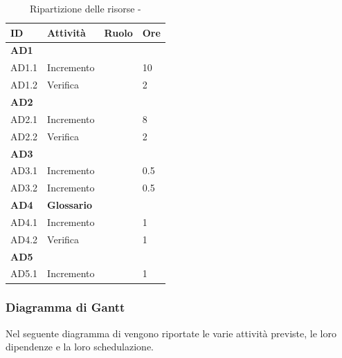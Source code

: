 \documentclass[12pt,a4paper]{article}
\begin{document}
\begin{table}[H]
	\begin{center}
		\begin{tabular}{p{} p{} p{} p{}}
			\toprule
			\textbf{ID}	& \textbf{Attività}	& \textbf{Ruolo} & \textbf{Ore}\\ \midrule
			\midrule
			\textbf{AD1} & \textbf{\AdR{}} & &  \\ \midrule
			AD1.1 & Incremento & \AN{} & 10 \\ \midrule
			AD1.2 & Verifica & \VR{} & 2 \\ \midrule
			\textbf{AD2} & \textbf{\NdP{}} &  &  \\ \midrule
			AD2.1 & Incremento & \AM{} & 8 \\ \midrule
			AD2.2 & Verifica & \VR{} & 2 \\ \midrule
			\textbf{AD3} & \textbf{\PdQ{}} & &  \\ \midrule
			AD3.1 & Incremento & \RE{} & 0.5 \\ \midrule
			AD3.2 & Incremento & \RE{} & 0.5 \\ \midrule
			\textbf{AD4} & \textbf{Glossario} & &  \\ \midrule
			AD4.1 & Incremento & \VR{} & 1 \\ \midrule
			AD4.2 & Verifica & \VR{} & 1 \\ \midrule
			\textbf{AD5} & \textbf{\PdP{}} & &  \\ \midrule
			AD5.1 & Incremento & \RE{} & 1 \\ \midrule
			\bottomrule
		\end{tabular}
		\caption{Ripartizione delle risorse - \FAD{}}
	\end{center}
\end{table}

\newpage
\subsubsection{Diagramma di Gantt}
\label{gantt analisi di dettaglio}
Nel seguente diagramma di  vengono riportate le varie attività previste, le loro dipendenze e la loro schedulazione.
\end{document}
